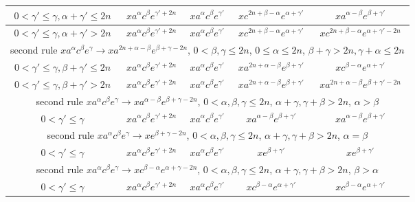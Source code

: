 \documentclass{article}
\theoremstyle{definition}
\begin{document}
\begin{center}
\begin{tabular}{|c|c|c|c|c|}
\hline
$0 < \gamma' \le \gamma, \alpha+\gamma' \le 2n$ & $x a^\alpha c^\beta e^{\gamma' +2n}$ & $x a^\alpha c^\beta e^{\gamma'}$ & $x c^{2n+\beta -\alpha} e^{\alpha+\gamma'} $ & $x a^{\alpha -\beta} e^{\beta+\gamma'}$ \\
\hline
$0 < \gamma' \le \gamma, \alpha+\gamma' > 2n$ & $x a^\alpha c^\beta e^{\gamma' +2n}$ & $x a^\alpha c^\beta e^{\gamma'}$ & $x c^{2n+\beta -\alpha} e^{\alpha+\gamma'} $ & $x c^{2n+\beta -\alpha} e^{\alpha+\gamma' -2n}$ \\
\hline
\multicolumn{5}{|c|}{second rule $x a^\alpha c^\beta e^\gamma \rightarrow x a^{2n+\alpha -\beta} e^{\beta+\gamma -2n}$,  $0< \beta, \gamma \le 2n$, $0 \le \alpha \le 2n$, $\beta+\gamma > 2n, \gamma+\alpha \le 2n$}\\
\hline
$0 < \gamma' \le \gamma, \beta+\gamma' \le 2n$ & $x a^\alpha c^\beta e^{\gamma' +2n}$ & $x a^\alpha c^\beta e^{\gamma'}$ & $x a^{2n+\alpha -\beta} e^{\beta+\gamma'} $ & $x c^{\beta -\alpha} e^{\alpha+\gamma'}$ \\
\hline
$0 < \gamma' \le \gamma, \beta+\gamma' > 2n$ & $x a^\alpha c^\beta e^{\gamma' +2n}$ & $x a^\alpha c^\beta e^{\gamma'}$ & $x a^{2n+\alpha -\beta} e^{\beta+\gamma'} $ & $x a^{2n +\alpha -\beta} e^{\beta+\gamma' -2n}$ \\
\hline
\multicolumn{5}{|c|}{second rule $x a^\alpha c^\beta e^\gamma \rightarrow x a^{\alpha - \beta} e^{\beta+\gamma - 2n}$,  $0< \alpha,\beta, \gamma \le 2n$, $\alpha+\gamma, \gamma+\beta > 2n$, $\alpha > \beta$}\\
\hline
$0 < \gamma' \le \gamma$ & $x a^\alpha c^\beta e^{\gamma' +2n}$ & $x a^\alpha c^\beta e^{\gamma'}$ & $x a^{\alpha -\beta} e^{\beta+\gamma'} $ &  $x a^{\alpha -\beta} e^{\beta+\gamma'} $ \\
\hline
\multicolumn{5}{|c|}{second rule $x a^\alpha c^\beta e^\gamma \rightarrow x  e^{\beta+\gamma - 2n}$,  $0< \alpha,\beta, \gamma \le 2n$, $\alpha+\gamma, \gamma+\beta > 2n$, $\alpha = \beta$}\\
\hline
$0 < \gamma' \le \gamma$ & $x a^\alpha c^\beta e^{\gamma' +2n}$ & $x a^\alpha c^\beta e^{\gamma'}$ & $x e^{\beta+\gamma'} $ &  $x e^{\beta+\gamma'} $ \\
\hline
\multicolumn{5}{|c|}{second rule $x a^\alpha c^\beta e^\gamma \rightarrow x c^{\beta - \alpha} e^{\alpha+\gamma -2n}$,  $0< \alpha,\beta, \gamma \le 2n$, $\alpha+\gamma, \gamma+\beta > 2n$, $\beta > \alpha$}\\
\hline
$0 < \gamma' \le \gamma$ & $x a^\alpha c^\beta e^{\gamma' +2n}$ & $x a^\alpha c^\beta e^{\gamma'}$ & $x c^{\beta -\alpha} e^{\alpha+\gamma'} $ &  $x c^{\beta -\alpha} e^{\alpha+\gamma'} $ \\
\hline

\end{tabular}
\end{center}
\end{document}
